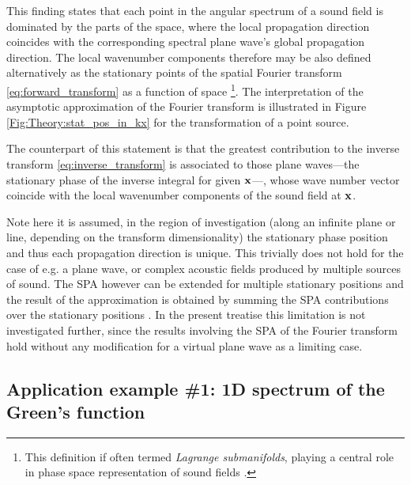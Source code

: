 This finding states that each point in the angular spectrum of a sound field is dominated by the parts of the space, where the local propagation direction coincides with the corresponding spectral plane wave's global propagation direction.
The local wavenumber components therefore may be also defined alternatively as the stationary points of the spatial Fourier transform \eqref{eq:forward_transform} as a function of space \footnote{This definition if often termed \emph{Lagrange submanifolds}, playing a central role in phase space representation of sound fields \cite{Arnold1995, Tinkelman2005, Steinberg1993}.}.
The interpretation of the asymptotic approximation of the Fourier transform is illustrated in Figure \ref{Fig:Theory:stat_pos_in_kx} for the transformation of a point source.

The counterpart of this statement is that the greatest contribution to the inverse transform \eqref{eq:inverse_transform} is associated to those plane waves---the stationary phase of the inverse integral for given $\mathbf{x}$---, whose wave number vector coincide with the local wavenumber components of the sound field at $\mathbf{x}$.

Note  here it is assumed,  in the region of investigation (along an infinite plane or line, depending on the transform dimensionality) the stationary phase position and thus each propagation direction is unique.
This trivially does not hold for the case of e.g. a plane wave, or complex acoustic fields produced by multiple sources of sound.
The SPA however can be extended for multiple stationary positions and the result of the approximation is obtained by summing the SPA contributions over the stationary positions \cite[p. 129]{Bleistein2000}.
In the present treatise this limitation is not investigated further, since the results involving the SPA of the Fourier transform hold without any modification for a virtual plane wave as a limiting case. 	

\subsection*{Application example \#1: 1D spectrum of the Green's function}
\label{sec:greens_function_spectrum}



